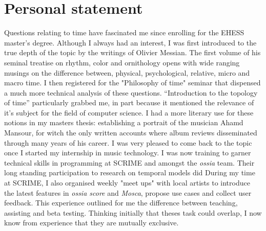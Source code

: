 \documentclass[journal,onecolumn]{IEEEtran}
\begin{document}
\section{Personal statement} %
Questions relating to time have fascinated me since enrolling for the EHESS master's degree. Although I always had an interest, I was first introduced to the true depth of the topic by the writings of Olivier Messian. The first volume of his seminal treatise on rhythm, color and ornithology\cite{messian:ornithology} opens with wide ranging musings on the difference between, physical, psychological, relative, micro and macro time. I then registered for the "Philosophy of time" seminar that  dispensed a much more technical analysis of these questions. ``Introduction to the topology of time''\cite{milliere:topologie} particularly grabbed me, in part because it mentioned the relevance of it's subject for the field of computer science. I had a more literary use for these notions in my masters thesis: establishing a portrait of the musician Ahamd Mansour, for witch the only written accounts where album reviews disseminated through many years of his career. I was very pleased to come back to the topic once I started my internship in music technology. I was now training to garner technical skills in programming at SCRIME and amongst the \textit{ossia} team. Their long standing  participation to research on temporal models did 
During my time at SCRIME, I also organised weekly "meet ups" with local artists to introduce the latest features in \textit{ossia score} and \textit{Mosca}, propose use cases and collect user feedback. This experience outlined for me the difference between teaching, assisting and beta testing. Thinking initially that theses task could overlap, I now know from experience that they are mutually exclusive.
\end{document}
